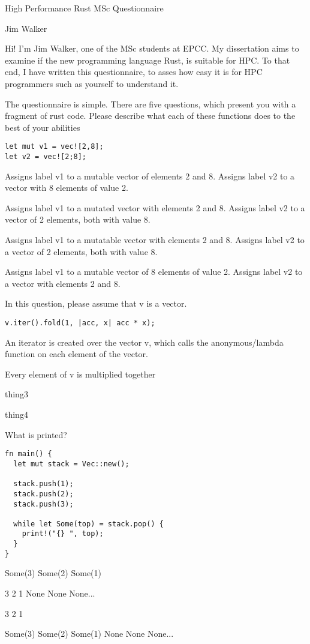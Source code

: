 \documentclass[11pt]{article} %
\newcommand*\choice{\item}
\begin{document}
\author{Jim Walker}
\begin{center}
\large {High Performance Rust MSc Questionnaire}

\normalsize Jim Walker
\end{center}

Hi! I'm Jim Walker, one of the MSc students at EPCC. My dissertation aims to examine if the new programming language Rust, is suitable for HPC. To that end, I have written this questionnaire, to asses how easy it is for HPC programmers such as yourself to understand it.

The questionnaire is simple. There are five questions, which present you with a fragment of rust code. Please describe what each of these functions does to the best of your abilities


\begin{multiplechoice}[choices=1]

\begin{lstlisting}
let mut v1 = vec![2,8];
let v2 = vec![2;8];
\end{lstlisting}

\choice Assigns label v1 to a mutable vector of elements 2 and 8. Assigns label v2 to a vector with 8 elements of value 2.
\choice Assigns label v1 to a mutated vector with elements 2 and 8. Assigns label v2 to a vector of 2 elements, both with value 8.
\choice Assigns label v1 to a mutatable vector with elements 2 and 8. Assigns label v2 to a vector of 2 elements, both with value 8.
\choice Assigns label v1 to a mutable vector of 8 elements of value 2. Assigns label v2 to a vector with elements 2 and 8.

\end{multiplechoice}


\begin{multiplechoice}[choices=1]
In this question, please assume that v is a vector.
\begin{lstlisting}
v.iter().fold(1, |acc, x| acc * x);
\end{lstlisting}
  \choice An iterator is created over the vector v, which calls the anonymous/lambda function on each element of the vector.
  \choice Every element of v is multiplied together
  \choice thing3
  \choice thing4
\end{multiplechoice}

\begin{multiplechoice}[choices=1]
What is printed?
\begin{lstlisting}
fn main() {
  let mut stack = Vec::new();

  stack.push(1);
  stack.push(2);
  stack.push(3);

  while let Some(top) = stack.pop() {
    print!("{} ", top);
  }
}
\end{lstlisting}
  \choice Some(3) Some(2) Some(1)
  \choice 3 2 1 None None None...
  \choice 3 2 1
  \choice Some(3) Some(2) Some(1) None None None...
\end{multiplechoice}
\end{document}
